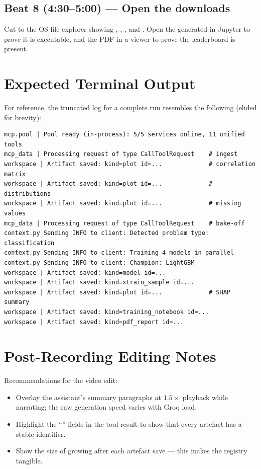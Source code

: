 \subsection*{Beat 8 (4:30--5:00) --- Open the downloads}
Cut to the OS file explorer showing ,
, ,
and . Open the generated
 in Jupyter to prove it is executable, and the PDF in
a viewer to prove the leaderboard is present.

\section{Expected Terminal Output}
\label{sec:terminal-output}

For reference, the truncated log for a complete run resembles the
following (elided for brevity):

\begin{lstlisting}[style=alBash, numbers=none]
mcp.pool | Pool ready (in-process): 5/5 services online, 11 unified tools
mcp_data | Processing request of type CallToolRequest    # ingest
workspace | Artifact saved: kind=plot id=...             # correlation matrix
workspace | Artifact saved: kind=plot id=...             # distributions
workspace | Artifact saved: kind=plot id=...             # missing values
mcp_data | Processing request of type CallToolRequest    # bake-off
context.py Sending INFO to client: Detected problem type: classification
context.py Sending INFO to client: Training 4 models in parallel
context.py Sending INFO to client: Champion: LightGBM
workspace | Artifact saved: kind=model id=...
workspace | Artifact saved: kind=xtrain_sample id=...
workspace | Artifact saved: kind=plot id=...             # SHAP summary
workspace | Artifact saved: kind=training_notebook id=...
workspace | Artifact saved: kind=pdf_report id=...
\end{lstlisting}

\section{Post-Recording Editing Notes}
\label{sec:post-record}

Recommendations for the video edit:

\begin{itemize}[leftmargin=1.4em]
  \item Overlay the assistant's summary paragraphs at $1.5\times$
        playback while narrating; the raw generation speed varies
        with Groq load.
  \item Highlight the ``'' fields in the tool
        result to show that every artefact has a stable identifier.
  \item Show the size of  growing
        after each artefact save --- this makes the registry
        tangible.
\end{itemize}

